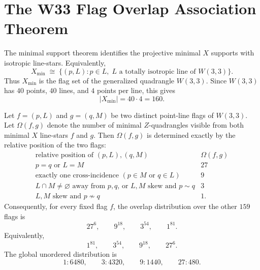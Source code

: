 
\section{The W33 Flag Overlap Association Theorem}
\label{sec:w33-flag-overlap-association}

The minimal support theorem identifies the projective minimal $X$ supports with
isotropic line-stars.  Equivalently,
\[
        X_{\min}\;\cong\;\{(p,L): p\in L,\; L\text{ a totally isotropic line of }W(3,3)\}.
\]
Thus $X_{\min}$ is the flag set of the generalized quadrangle $W(3,3)$.
Since $W(3,3)$ has $40$ points, $40$ lines, and $4$ points per line, this gives
\[
        |X_{\min}|=40\cdot4=160.
\]

\begin{theorem}
Let $f=(p,L)$ and $g=(q,M)$ be two distinct point-line flags of $W(3,3)$.
Let $\Omega(f,g)$ denote the number of minimal $Z$-quadrangles visible from both
minimal $X$ line-stars $f$ and $g$.  Then $\Omega(f,g)$ is determined exactly by
the relative position of the two flags:
\[
\begin{array}{c|c}
\text{relative position of }(p,L),(q,M) & \Omega(f,g)\\
\hline
p=q\text{ or }L=M & 27\\
\text{exactly one cross-incidence }(p\in M\text{ or }q\in L) & 9\\
L\cap M\ne\varnothing\text{ away from }p,q\text{, or }L,M\text{ skew and }p\sim q & 3\\
L,M\text{ skew and }p\not\sim q & 1.
\end{array}
\]
Consequently, for every fixed flag $f$, the overlap distribution over the other
$159$ flags is
\[
        27^6,\qquad 9^{18},\qquad 3^{54},\qquad 1^{81}.
\]
Equivalently,
\[
        1^{81},\qquad 3^{54},\qquad 9^{18},\qquad 27^6.
\]
The global unordered distribution is
\[
        1:6480,
        \qquad
        3:4320,
        \qquad
        9:1440,
        \qquad
        27:480.
\]
\end{theorem}

